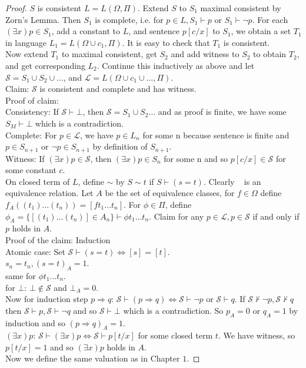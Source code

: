 \begin{proof} $S$ is consistent $L=L(\Omega, \Pi)$. Extend $S$ to $S_1$ maximal consistent by Zorn's Lemma. Then $S_1$ is complete, i.e. for $p \in L, S_1 \vdash p$ or $S_1 \vdash \neg p$. For each $(\exists x)p \in S_1$, add a constant to $L$, and sentence $p[c/x]$ to $S_1$, we obtain a set $T_1$ in language $L_1=L(\Omega \cup c_1, \Pi)$. It is easy to check that $T_1$ is consistent.\\
Now extend $T_1$ to maximal consistent, get $S_2$ and add witness to $S_2$ to obtain $T_2$, and get corresponding $L_2$. Continue this inductively as above and let $\mathcal{S} = S_1 \cup S_2 \cup \ldots$, and $\mathcal{L}=L(\Omega \cup c_1 \cup \ldots, \Pi)$.\\
Claim: $\mathcal{S}$ is consistent and complete and has witness.\\
Proof of claim:\\
Consistency: If $\mathcal{S} \vdash \bot$, then $\mathcal{S}=S_1 \cup S_2 \ldots$ and as proof is finite, we have some $S_M \vdash \bot$ which is a contradiction.\\
Complete: For $p \in \mathcal{L}$, we have $p \in L_n$ for some n because sentence is finite and $p \in S_{n+1}$ or $\neg p \in S_{n+1}$ by definition of $S_{n+1}$.\\
Witness: If $(\exists x)p \in \mathcal{S}$, then $(\exists x)p \in S_n$ for some n and so $p[c/x] \in \mathcal{S}$ for some constant $c$.\\
On closed term of $L$, define $\sim$ by $S \sim t$ if $S \vdash (s=t)$. Clearly ~ is an equivalence relation. Let $A$ be the set of equivalence classes, for $f \in \Omega$ define $f_A((t_1) \ldots (t_n))=[f{t_1} \ldots t_n]$. For $\phi \in \Pi$, define $\phi_A =\{[(t_1) \ldots (t_n)] \in A_n \} \vdash \phi t_1 \ldots t_n$. Claim for any $p \in \mathcal{L}, p \in \mathcal{S}$ if and only if $p$ holds in $A$.\\
Proof of the claim: Induction\\
Atomic case: Set $\mathcal{S} \vdash (s=t) \iff [s]=[t]$.\\
$s_n =t_n, (s=t)_A=1$.\\
same for $\phi t_1 \ldots t_n$.\\
for $\bot$: $\bot \not \in \mathcal{S}$ and $\bot_A=0$.\\
Now for induction step $p \Rightarrow q$: $\mathcal{S} \vdash (p \Rightarrow q) \iff \mathcal{S} \vdash \neg p$ or $\mathcal{S} \vdash q$. If $\mathcal{S} \not \vdash \neg p, \mathcal{S} \not \vdash q$ then $\mathcal{S} \vdash p, \mathcal{S} \vdash \neg q$ and so $\mathcal{S} \vdash \bot$ which is a contradiction. So $p_A=0$ or $q_A =1$ by induction and so $(p \Rightarrow q)_A =1$.\\
$(\exists x)p$: $\mathcal{S} \vdash (\exists x)p \iff \mathcal{S} \vdash p[t/x]$ for some closed term $t$. We have witness, so $p[t/x]=1$ and so $(\exists x)p$ holds in $A$. \\
Now we define the same valuation as in Chapter $1$.
\end{proof}
